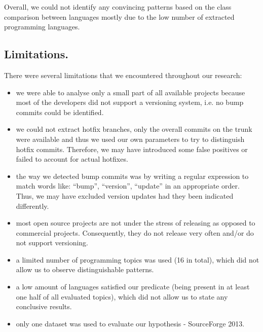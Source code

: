 Overall, we could not identify any convincing patterns based on the class comparison between languages mostly due to the low number of extracted programming languages.

\subsection{Limitations.}
There were several limitations that we encountered throughout our research:
\begin{itemize}
  \item we were able to analyse only a small part of all available projects because most of the developers did not support a versioning system, i.e. no bump commits could be identified.
  \item we could not extract hotfix branches, only the overall commits on the trunk were available and thus we used our own parameters to try to distinguish hotfix commits. Therefore, we may have introduced some false positives or failed to account for actual hotfixes.
  \item the way we detected bump commits was by writing a regular expression to match words like:  ``bump'', ``version'', ``update'' in an appropriate order. Thus, we may have excluded version updates had they been indicated differently. 
  \item most open source projects are not under the stress of releasing as opposed to commercial projects. Consequently, they do not release very often and/or do not support versioning.
  \item a limited number of programming topics was used (16 in total), which did not allow us to observe distinguishable patterns.
  \item a low amount of languages satisfied our predicate (being present in at least one half of all evaluated topics), which did not allow us to state any conclusive results.
  \item only one dataset was used to evaluate our hypothesis - SourceForge 2013.
\end{itemize}

